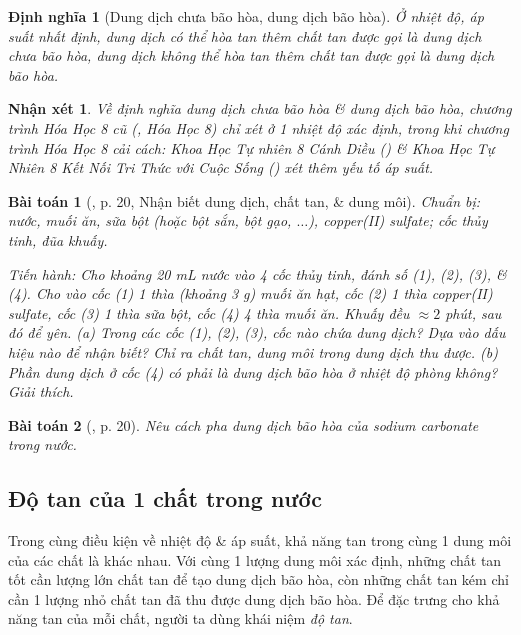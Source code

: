 \documentclass{article}
\newtheorem{baitoan}{Bài toán}
\newtheorem{dinhnghia}{Định nghĩa}
\newtheorem{nhanxet}{Nhận xét}
\begin{document}
\begin{dinhnghia}[Dung dịch chưa bão hòa, dung dịch bão hòa]
	Ở nhiệt độ, áp suất nhất định, dung dịch có thể hòa tan thêm chất tan được gọi là \emph{dung dịch chưa bão hòa}, dung dịch không thể hòa tan thêm chất tan được gọi là \emph{dung dịch bão hòa}.
\end{dinhnghia}

\begin{nhanxet}
	Về định nghĩa dung dịch chưa bão hòa \& dung dịch bão hòa, chương trình Hóa Học 8 cũ (\cite{SGK_Hoa_Hoc_8}, Hóa Học 8) chỉ xét ở 1 nhiệt độ xác định, trong khi chương trình Hóa Học 8 cải cách: Khoa Học Tự nhiên 8 Cánh Diều (\cite{SGK_KHTN_8_Canh_Dieu}) \& Khoa Học Tự Nhiên 8 Kết Nối Tri Thức với Cuộc Sống (\cite{SGK_KHTN_8_KNTTVCS}) xét thêm yếu tố áp suất.
\end{nhanxet}

\begin{baitoan}[\cite{SGK_KHTN_8_KNTTVCS}, p. 20, Nhận biết dung dịch, chất tan, \& dung môi]
	\emph{Chuẩn bị:} nước, muối ăn, sữa bột (hoặc bột sắn, bột gạo, $\ldots$), copper(II) sulfate; cốc thủy tinh, đũa khuấy.
	
	\emph{Tiến hành:} Cho khoảng \emph{20 mL} nước vào 4 cốc thủy tinh, đánh số (1), (2), (3), \& (4). Cho vào cốc (1) 1 thìa (khoảng \emph{3 g}) muối ăn hạt, cốc (2) 1 thìa copper(II) sulfate, cốc (3) 1 thìa sữa bột, cốc (4) 4 thìa muối ăn. Khuấy đều $\approx2$ phút, sau đó để yên. (a) Trong các cốc (1), (2), (3), cốc nào chứa dung dịch? Dựa vào dấu hiệu nào để nhận biết? Chỉ ra chất tan, dung môi trong dung dịch thu được. (b) Phần dung dịch ở cốc (4) có phải là dung dịch bão hòa ở nhiệt độ phòng không? Giải thích.
\end{baitoan}

\begin{baitoan}[\cite{SGK_KHTN_8_KNTTVCS}, p. 20]
	Nêu cách pha dung dịch bão hòa của sodium carbonate \emph{} trong nước.
\end{baitoan}

\subsection{Độ tan của 1 chất trong nước}
Trong cùng điều kiện về nhiệt độ \& áp suất, khả năng tan trong cùng 1 dung môi của các chất là khác nhau. Với cùng 1 lượng dung môi xác định, những chất tan tốt cần lượng lớn chất tan để tạo dung dịch bão hòa, còn những chất tan kém chỉ cần 1 lượng nhỏ chất tan đã thu được dung dịch bão hòa. Để đặc trưng cho khả năng tan của mỗi chất, người ta dùng khái niệm \textit{độ tan}.
\end{document}

